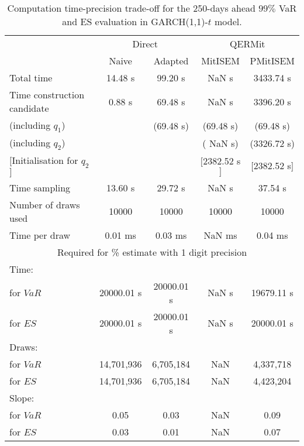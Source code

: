 { \renewcommand{\arraystretch}{1.3} 
\begin{table}[h] 
\centering 
\caption{Computation time-precision trade-off for the 250-days ahead  $99\%$ VaR and ES evaluation in GARCH(1,1)-$t$ model.} 
\label{tab:time_precision_t_garch2_noS} 
\begin{tabular}{lcccc}  
  & \multicolumn{2}{c}{Direct} & \multicolumn{2}{c}{QERMit}  \\ \cline{2-5} 
  & Naive & Adapted & MitISEM & PMitISEM  \\ \hline 
Total time & 14.48 s & 99.20 s &  NaN s & 3433.74 s \\ 
Time construction candidate & 0.88 s & 69.48 s &  NaN s & 3396.20 s \\ 
 (including $q_{1}$) &   &  (69.48 s) & (69.48 s) & (69.48 s) \\ 
 (including $q_{2}$) &   &  & ( NaN s) & (3326.72 s) \\ 
$[$Initialisation for $q_{2}$$]$&   &   & $[$2382.52 s$]$ & $[$2382.52 s$]$ \\ 
Time sampling & 13.60 s & 29.72 s &  NaN s & 37.54 s  \\  
Number of draws used & 10000 & 10000 & 10000 & 10000 \\ 
Time per draw & 0.01 ms & 0.03 ms &  NaN ms & 0.04 ms \\ \hline 
\multicolumn{5}{c}{Required for \% estimate with 1 digit precision} \\ \hline 
Time: &  &  &   &  \\ 
\hspace{1cm} for $VaR$ & 20000.01 s & 20000.01 s &  NaN s & 19679.11 s \\ 
\hspace{1cm} for $ES$ & 20000.01 s & 20000.01 s &  NaN s & 20000.01 s \\ 
Draws: &  &  &   &  \\ 
\hspace{1cm} for $VaR$ & 14,701,936 & 6,705,184  & NaN  & 4,337,718  \\ 
\hspace{1cm} for $ES$ & 14,701,936 & 6,705,184  & NaN   & 4,423,204  \\ 
\hline 
Slope: &  &  &   &  \\ 
\hspace{1cm} for $VaR$ & 0.05 & 0.03  &  NaN  & 0.09  \\ 
\hspace{1cm} for $ES$ & 0.03 & 0.01  &  NaN   & 0.07  \\  \hline 
\end{tabular} 
\end{table} 
} 
